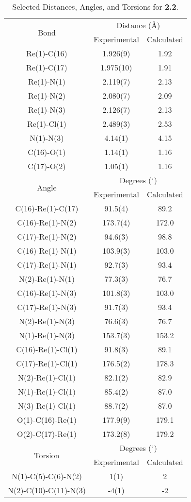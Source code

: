 \begin{table}[htbp]
  \caption{Selected Distances, Angles, and Torsions for \textbf{2.2}.}
  \centering
    \begin{tabular}{ccc}
    \toprule
    \multirow{2}{*}{Bond} & \multicolumn{2}{c}{Distance (\r{A})} \\ \cline{2-3}
     & Experimental & Calculated \\ \midrule
    Re(1)-C(16) & 1.926(9) & 1.92\\
    Re(1)-C(17) & 1.975(10) & 1.91\\
    Re(1)-N(1) & 2.119(7) & 2.13\\
    Re(1)-N(2) & 2.080(7) & 2.09\\
    Re(1)-N(3) & 2.126(7) & 2.13\\
    Re(1)-Cl(1) & 2.489(3) & 2.53 \\
    N(1)-N(3) & 4.14(1) & 4.15 \\ 
    C(16)-O(1) & 1.14(1) & 1.16 \\
    C(17)-O(2) & 1.05(1) & 1.16 \\ \midrule
    \multirow{2}{*}{Angle} & \multicolumn{2}{c}{Degrees ($^\circ$)} \\ \cline{2-3}
     & Experimental & Calculated \\ \midrule
    C(16)-Re(1)-C(17) & 91.5(4) & 89.2 \\
    C(16)-Re(1)-N(2) & 173.7(4) & 172.0 \\
    C(17)-Re(1)-N(2) & 94.6(3) & 98.8 \\
    C(16)-Re(1)-N(1) & 103.9(3) & 103.0 \\
    C(17)-Re(1)-N(1) & 92.7(3) & 93.4 \\
    N(2)-Re(1)-N(1) & 77.3(3) & 76.7 \\
    C(16)-Re(1)-N(3) & 101.8(3) & 103.0 \\
    C(17)-Re(1)-N(3) & 91.7(3) & 93.4 \\
    N(2)-Re(1)-N(3) & 76.6(3) & 76.7 \\
    N(1)-Re(1)-N(3) & 153.7(3) & 153.2 \\
    C(16)-Re(1)-Cl(1) & 91.8(3) & 89.1 \\
    C(17)-Re(1)-Cl(1) & 176.5(2) & 178.3 \\
    N(2)-Re(1)-Cl(1) & 82.1(2) & 82.9 \\
    N(1)-Re(1)-Cl(1) & 85.4(2) & 87.0 \\
    N(3)-Re(1)-Cl(1) & 88.7(2) & 87.0 \\
    O(1)-C(16)-Re(1) & 177.9(9) & 179.1 \\
    O(2)-C(17)-Re(1) & 173.2(8) & 179.2 \\ \midrule
    \multirow{2}{*}{Torsion} & \multicolumn{2}{c}{Degrees ($^\circ$)} \\ \cline{2-3}
     & Experimental & Calculated \\ \midrule
    N(1)-C(5)-C(6)-N(2) & 1(1) & 2 \\
    N(2)-C(10)-C(11)-N(3) & -4(1) & -2 \\
    \bottomrule
    \end{tabular}%
  \label{tab.da2}%
\end{table}%


